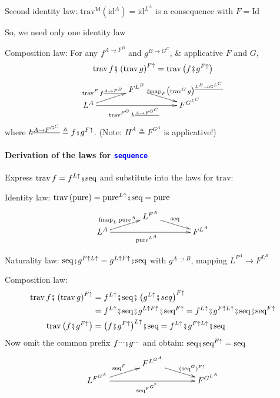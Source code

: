 Second identity law: $\text{trav}^{\text{Id}}(\text{id}^{A})=\text{id}^{L^{A}}$
is a consequence with $F=\text{Id}$

So, we need only one identity law

Composition law: For any $f^{\underline{A\rightarrow F^{B}}}$ and
$g^{\underline{B\rightarrow G^{C}}}$, \& applicative $F$ and $G$,
\[
\text{trav}\,f\bef\left(\text{trav}\,g\right)^{F\uparrow}=\text{trav}\,\big(f\bef g^{F\uparrow}\big)
\]
\[
\xymatrix{\xyScaleY{0.2pc}\xyScaleX{3pc} & F^{L^{B}}\ar[rd]\sp(0.55){\ \ \ \ \text{fmap}_{F}\big(\text{trav}^{G}\,g\big)^{\underline{L^{B}\rightarrow G^{L^{C}}}}}\\
L^{A}\ar[ru]\sp(0.45){\text{trav}^{F}\,f^{\underline{A\rightarrow F^{B}}}}\ar[rr]\sb(0.45){\text{trav}^{F^{G}}\,h^{\underline{A\rightarrow F^{G^{C}}}}} &  & F^{G^{L^{C}}}
}
\]
where $h^{\underline{A\rightarrow F^{G^{C}}}}\triangleq f\bef g^{F\uparrow}$.
(Note: $H^{A}\triangleq F^{G^{A}}$ is applicative!)


\paragraph{Derivation of the laws for \texttt{\textcolor{blue}{\footnotesize{}sequence}} }

\vspace{-0.15cm}Express $\text{trav}\,f=f^{L\uparrow}\bef\text{seq}$
and substitute into the laws for $\text{trav}$:

Identity law:{\small{} $\text{trav}\left(\text{pure}\right)=\text{pure}^{L\uparrow}\bef\text{seq}=\text{pure}$}{\footnotesize{}
\[
\xymatrix{\xyScaleY{0.2pc}\xyScaleX{3pc} & L^{F^{A}}\ar[rd]\sp(0.45){\text{seq}}\\
L^{A}\ar[rr]\sb(0.45){\text{pure}^{L^{A}}}\ar[ru]\sp(0.45){\text{fmap}_{L}\,\text{pure}^{A}} &  & F^{L^{A}}
}
\]
}{\footnotesize\par}

Naturality law: $\text{seq}\bef g^{F\uparrow L\uparrow}=g^{L\uparrow F\uparrow}\bef\text{seq}$
with $g^{\underline{A\rightarrow B}}$, mapping $L^{F^{A}}\rightarrow F^{L^{B}}$

Composition law: {\footnotesize{}
\begin{align*}
\text{trav}\,f\bef\left(\text{trav}\,g\right)^{F\uparrow} & =f^{L\uparrow}\bef\text{seq}\bef\left(g^{L\uparrow}\bef seq\right)^{F\uparrow}\\
 & =f^{L\uparrow}\bef\text{seq}\bef g^{L\uparrow F\uparrow}\bef\text{seq}^{F\uparrow}=f^{L\uparrow}\bef g^{F\uparrow L\uparrow}\bef\text{seq}\bef\text{seq}^{F\uparrow}\\
\text{trav}\,\big(f\bef g^{F\uparrow}\big) & =\big(f\bef g^{F\uparrow}\big)^{L\uparrow}\bef\text{seq}=f^{L\uparrow}\bef g^{F\uparrow L\uparrow}\bef\text{seq}
\end{align*}
}Now omit the common prefix $f^{...}\bef g^{...}$ and obtain: $\text{seq}\bef\text{seq}^{F\uparrow}=\text{seq}${\footnotesize{}
\[
\xymatrix{\xyScaleY{0.2pc}\xyScaleX{3pc} & F^{L^{G^{A}}}\ar[rd]\sp(0.6){\ (\text{seq}^{G})^{F\uparrow}}\\
L^{F^{G^{A}}}\ar[ru]\sp(0.45){\text{seq}^{F}}\ar[rr]\sb(0.45){\text{seq}^{F^{G^{?}}}} &  & F^{G^{L^{A}}}
}
\]
}{\footnotesize\par}


